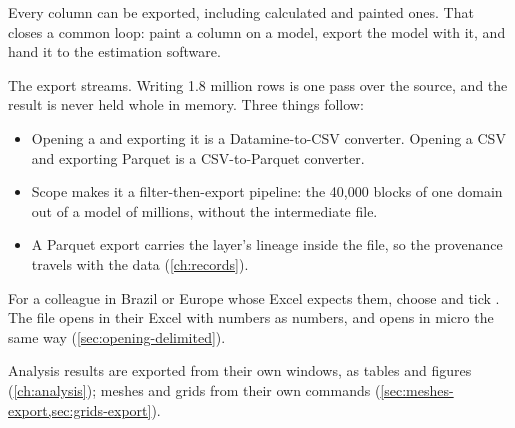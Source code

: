 Every column can be exported, including calculated and painted ones. That closes a common loop: paint a  column on a model, export the model with it, and hand it to the estimation software.

The export streams. Writing 1.8 million rows is one pass over the source, and the result is never held whole in memory. Three things follow:

\begin{itemize}
\item Opening a  and exporting it is a Datamine-to-CSV converter. Opening a CSV and exporting Parquet is a CSV-to-Parquet converter.
\item Scope  makes it a filter-then-export pipeline: the 40,000 blocks of one domain out of a model of millions, without the intermediate file.
\item A Parquet export carries the layer's lineage inside the file, so the provenance travels with the data (\cref{ch:records}).
\end{itemize}

\begin{tip}
For a colleague in Brazil or Europe whose Excel expects them, choose  and tick . The file opens in their Excel with numbers as numbers, and opens in micro the same way (\cref{sec:opening-delimited}).
\end{tip}

Analysis results are exported from their own windows, as tables and figures (\cref{ch:analysis}); meshes and grids from their own commands (\cref{sec:meshes-export,sec:grids-export}).
